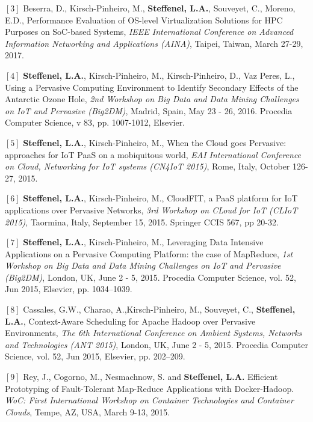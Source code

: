 \documentclass[final,twoside]{hdr} %
\begin{document}
\vspace{1em} \noindent $[3]$
Beserra, D., Kirsch-Pinheiro, M., {\bf Steffenel, L.A.}, Souveyet, C., Moreno, E.D., {Performance Evaluation of OS-level Virtualization Solutions for HPC Purposes on SoC-based Systems}, {\em IEEE International Conference on  Advanced Information Networking and Applications (AINA)}, Taipei, Taiwan, March 27-29, 2017.

\vspace{1em} \noindent $[4]$
{\bf Steffenel, L.A.}, Kirsch-Pinheiro, M., Kirsch-Pinheiro, D., Vaz Peres, L., {Using a Pervasive Computing Environment to Identify Secondary Effects of the Antarctic Ozone Hole}, {\em 2nd Workshop on Big Data and Data Mining Challenges on IoT and Pervasive (Big2DM)}, Madrid, Spain, May 23 - 26, 2016. Procedia Computer Science, v 83, pp. 1007-1012, Elsevier. 

\vspace{1em} \noindent $[5]$
{\bf Steffenel, L.A.}, Kirsch-Pinheiro, M.,  {When the Cloud goes Pervasive: approaches for IoT PaaS on a mobiquitous world},  {\em EAI International Conference on Cloud, Networking for IoT systems (CN4IoT 2015)}, Rome, Italy, October 126-27, 2015. 

\vspace{1em} \noindent $[6]$
{\bf Steffenel, L.A.}, Kirsch-Pinheiro, M.,  {CloudFIT, a PaaS platform for IoT applications over Pervasive Networks},  {\em 3rd Workshop on CLoud for IoT (CLIoT 2015)}, Taormina, Italy, September 15, 2015. Springer CCIS 567, pp 20-32.

\vspace{1em} \noindent $[7]$
{\bf Steffenel, L.A.}, Kirsch-Pinheiro, M.,  {Leveraging Data Intensive Applications on a Pervasive Computing Platform: the case of MapReduce}, {\em  1st Workshop on Big Data and Data Mining Challenges on IoT and Pervasive (Big2DM)}, London, UK, June 2 - 5, 2015. Procedia Computer Science, vol. 52, Jun 2015, Elsevier, pp. 1034–1039.  

\vspace{1em} \noindent $[8]$
Cassales, G.W., Charao, A.,Kirsch-Pinheiro, M., Souveyet, C., {\bf Steffenel, L.A.}, {Context-Aware Scheduling for Apache Hadoop over Pervasive Environments}, {\em The 6th International Conference on Ambient Systems, Networks and Technologies (ANT 2015)},  London, UK, June 2 - 5, 2015. Procedia Computer Science, vol. 52, Jun 2015, Elsevier, pp. 202–209.  

\vspace{1em} \noindent $[9]$
Rey, J., Cogorno, M., Nesmachnow, S. and {\bf Steffenel, L.A.} {Efficient Prototyping of Fault-Tolerant Map-Reduce Applications with Docker-Hadoop}. {\em WoC: First International Workshop on Container Technologies and Container Clouds},  Tempe, AZ, USA, March 9-13, 2015.
\end{document}

